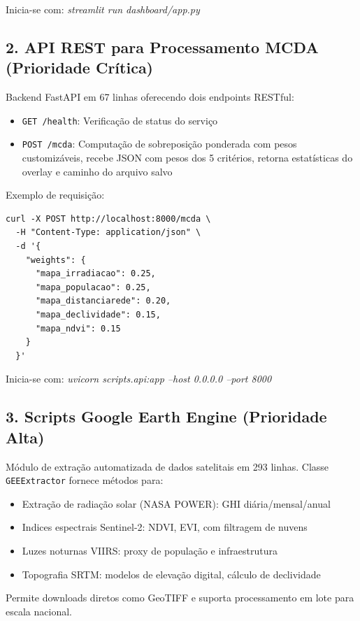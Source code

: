 \documentclass[12pt, a4paper]{article}
\begin{document}
Inicia-se com: \textit{streamlit run dashboard/app.py}

\subsection{2. API REST para Processamento MCDA (Prioridade Crítica)}

Backend FastAPI em 67 linhas oferecendo dois endpoints RESTful:

\begin{itemize}
    \item \texttt{GET /health}: Verificação de status do serviço
    \item \texttt{POST /mcda}: Computação de sobreposição ponderada com pesos customizáveis, recebe JSON com pesos dos 5 critérios, retorna estatísticas do overlay e caminho do arquivo salvo
\end{itemize}

Exemplo de requisição:
\begin{verbatim}
curl -X POST http://localhost:8000/mcda \
  -H "Content-Type: application/json" \
  -d '{
    "weights": {
      "mapa_irradiacao": 0.25,
      "mapa_populacao": 0.25,
      "mapa_distanciarede": 0.20,
      "mapa_declividade": 0.15,
      "mapa_ndvi": 0.15
    }
  }'
\end{verbatim}

Inicia-se com: \textit{uvicorn scripts.api:app --host 0.0.0.0 --port 8000}

\subsection{3. Scripts Google Earth Engine (Prioridade Alta)}

Módulo de extração automatizada de dados satelitais em 293 linhas. Classe \texttt{GEEExtractor} fornece métodos para:

\begin{itemize}
    \item Extração de radiação solar (NASA POWER): GHI diária/mensal/anual
    \item Indices espectrais Sentinel-2: NDVI, EVI, com filtragem de nuvens
    \item Luzes noturnas VIIRS: proxy de população e infraestrutura
    \item Topografia SRTM: modelos de elevação digital, cálculo de declividade
\end{itemize}

Permite downloads diretos como GeoTIFF e suporta processamento em lote para escala nacional.
\end{document}
